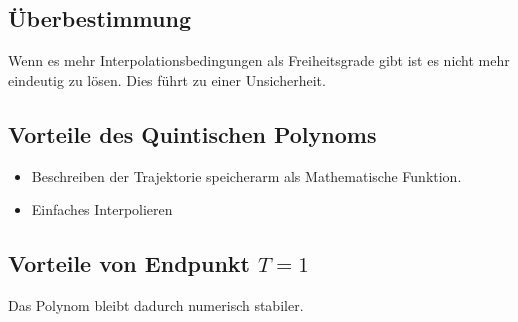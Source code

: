 \subsection{Überbestimmung}
Wenn es mehr Interpolationsbedingungen als Freiheitsgrade gibt ist es nicht mehr eindeutig zu lösen. Dies führt zu einer Unsicherheit.

\subsection{Vorteile des Quintischen Polynoms}
\begin{itemize}
	\item Beschreiben der Trajektorie speicherarm als Mathematische Funktion.
	\item Einfaches Interpolieren
\end{itemize}

\subsection{Vorteile von Endpunkt $T = 1$}
Das Polynom bleibt dadurch numerisch stabiler.


